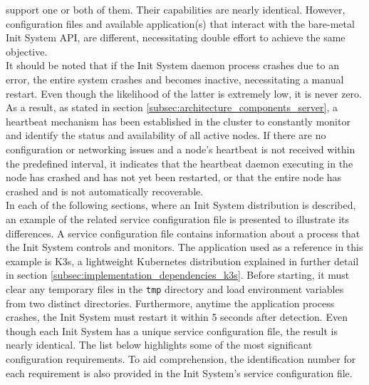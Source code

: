 support one or both of them. Their capabilities are nearly identical. However,
configuration files and available application(s) that interact with the bare-metal
Init System API, are different, necessitating double effort to achieve the same objective.
\\ %
It should be noted that if the Init System daemon process crashes due to an error,
the entire system crashes and becomes inactive, necessitating a manual restart.
Even though the likelihood of the latter is extremely low, it is never zero. As
a result, as stated in section \ref{subsec:architecture_components_server}, a
heartbeat mechanism has been established in the cluster to constantly monitor
and identify the status and availability of all active nodes. If there are no configuration
or networking issues and a node's heartbeat is not received within the predefined
interval, it indicates that the heartbeat daemon executing in the node has
crashed and has not yet been restarted, or that the entire node has crashed and is
not automatically recoverable. \\ %
In each of the following sections, where an Init System distribution is
described, an example of the related service configuration file is presented to illustrate
its differences. A service configuration file contains information about a
process that the Init System controls and monitors. The application used as a reference
in this example is K3s, a lightweight Kubernetes distribution explained in
further detail in section \ref{subsec:implementation_dependencies_k3s}. Before starting,
it must clear any temporary files in the \texttt{tmp} directory and load environment
variables from two distinct directories. Furthermore, anytime the application process
crashes, the Init System must restart it within 5 seconds after detection. Even though
each Init System has a unique service configuration file, the result is nearly
identical. The list below highlights some of the most significant configuration requirements.
To aid comprehension, the identification number for each requirement is also provided
in the Init System's service configuration file.
